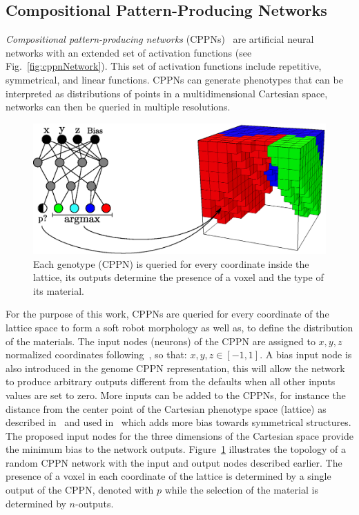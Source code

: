\documentclass{sig-alternate}
\begin{document}
\subsection{Compositional Pattern-Producing Networks}



\emph{Compositional pattern-producing networks} (CPPNs)~\cite{stanley2007compositional} are artificial neural networks with an extended set of activation functions (see Fig.~\ref{fig:cppnNetwork}). This set of activation functions include repetitive, symmetrical, and linear functions. CPPNs can generate phenotypes that can be interpreted as distributions of points in a multidimensional Cartesian space, networks can then be queried in multiple resolutions.

\begin{figure}[b!]
\centering
\includegraphics[width=0.35\textheight]{../Figures/Misc/cppnSoftBot.eps}
\caption{Each genotype (CPPN) is queried for every coordinate inside the lattice, its outputs determine the presence of a voxel and the type of its material.}
\label{fig:cppnDiagram}
\vspace{-15pt}
\end{figure}

For the purpose of this work, CPPNs are queried for every coordinate of the lattice space to form a soft robot morphology as well as, to define the distribution of the materials. The input nodes (neurons) of the CPPN are assigned to $x,y,z$ normalized coordinates following~\cite{cheney2013unshackling}, so that:
$x,y,z \in [-1,1]$.
A bias input node is also introduced in the genome CPPN representation, this will allow the network to produce arbitrary outputs different from the defaults when all other inputs values are set to zero. More inputs can be added to the CPPNs, for instance the distance from the center point of the Cartesian phenotype space (lattice) as described in~\cite{stanley2007compositional} and used in~\cite{cheney2013unshackling} which adds more bias towards symmetrical structures. The proposed input nodes for the three dimensions of the Cartesian space provide the minimum bias to the network outputs. Figure~\ref{fig:cppnDiagram} illustrates the topology of a random CPPN network with the input and output nodes  described earlier. The presence of a voxel in each coordinate of the lattice is determined by a single output of the CPPN, denoted with $p$ while the selection of the material is determined by $n$-outputs.
\end{document}
